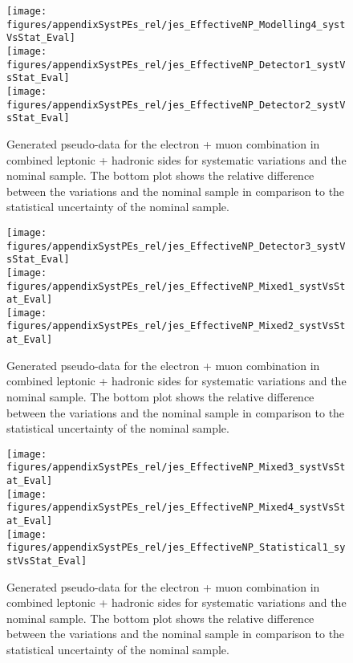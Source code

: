\begin{figure}[!hb]
\begin{center}
        \texttt{[image: figures/appendixSystPEs\_rel/jes\_EffectiveNP\_Modelling4\_systVsStat\_Eval]}\\
        \texttt{[image: figures/appendixSystPEs\_rel/jes\_EffectiveNP\_Detector1\_systVsStat\_Eval]}\\
        \texttt{[image: figures/appendixSystPEs\_rel/jes\_EffectiveNP\_Detector2\_systVsStat\_Eval]}
        
\caption{Generated pseudo-data for the electron + muon combination in combined leptonic + hadronic sides for systematic variations and the nominal \ttbar sample. The bottom plot shows the relative difference between the variations and the nominal sample in comparison to the statistical uncertainty of the nominal sample.}   
\label{fig:systematicVar_lephad_JES_2_1}
\end{center}
\end{figure}

\begin{figure}[!hb]
\begin{center}
        \texttt{[image: figures/appendixSystPEs\_rel/jes\_EffectiveNP\_Detector3\_systVsStat\_Eval]}\\
        \texttt{[image: figures/appendixSystPEs\_rel/jes\_EffectiveNP\_Mixed1\_systVsStat\_Eval]}\\
        \texttt{[image: figures/appendixSystPEs\_rel/jes\_EffectiveNP\_Mixed2\_systVsStat\_Eval]}
\caption{Generated pseudo-data for the electron + muon combination in combined leptonic + hadronic sides for systematic variations and the nominal \ttbar sample. The bottom plot shows the relative difference between the variations and the nominal sample in comparison to the statistical uncertainty of the nominal sample.}   
\label{fig:systematicVar_lephad_JES_2_2}
\end{center}
\end{figure}
        
\begin{figure}[!hb]
\begin{center}
        \texttt{[image: figures/appendixSystPEs\_rel/jes\_EffectiveNP\_Mixed3\_systVsStat\_Eval]}\\
        \texttt{[image: figures/appendixSystPEs\_rel/jes\_EffectiveNP\_Mixed4\_systVsStat\_Eval]}\\
        \texttt{[image: figures/appendixSystPEs\_rel/jes\_EffectiveNP\_Statistical1\_systVsStat\_Eval]}\\
\caption{Generated pseudo-data for the electron + muon combination in combined leptonic + hadronic sides for systematic variations and the nominal \ttbar sample. The bottom plot shows the relative difference between the variations and the nominal sample in comparison to the statistical uncertainty of the nominal sample.}   
\label{fig:systematicVar_lephad_JES_3_1}
\end{center}
\end{figure}        
        
